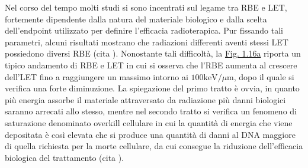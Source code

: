 \documentclass[12pt,a4paper,twoside]{report}
\begin{document}
	Nel corso del tempo molti studi si sono incentrati sul legame tra RBE e LET, fortemente dipendente dalla natura del materiale biologico e dalla scelta dell'endpoint utilizzato per definire l'efficacia radioterapica. Pur fissando tali parametri, alcuni risultati mostrano che radiazioni differenti aventi stessi LET possiedono diversi RBE (cita
	). Nonostante tali difficoltà, la \hyperref[fig:let_rbe]{Fig. 1.16a} riporta un tipico andamento di RBE e LET in cui si osserva che l'RBE aumenta al crescere dell'LET fino a raggiungere un massimo intorno ai $100\mbox{keV}/\mu\mbox{m}$, dopo il quale si verifica una forte diminuzione. La spiegazione del primo tratto è ovvia, in quanto più energia assorbe il materiale attraversato da radiazione più danni biologici saranno arrecati allo stesso, mentre nel secondo tratto si verifica un fenomeno di saturazione denominato overkill cellulare in cui la quantità di energia che viene depositata è così elevata che si produce una quantità di danni al DNA maggiore di quella richiesta per la morte cellulare, da cui consegue la riduzione dell'efficacia biologica del trattamento (cita
	).
	
\end{document}
